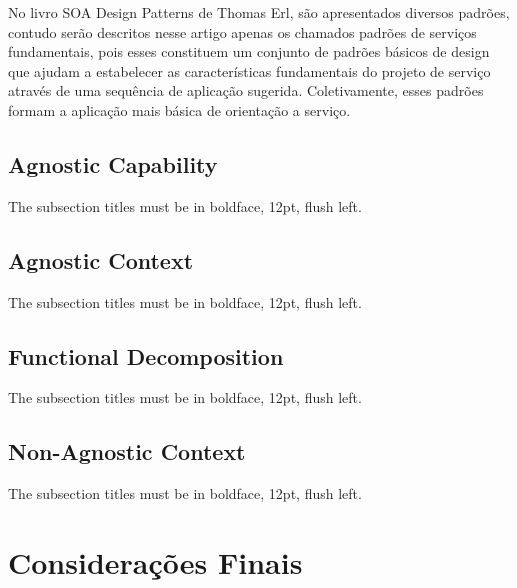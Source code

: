 \documentclass[12pt]{article}
\begin{document}
No livro SOA Design Patterns de Thomas Erl, são apresentados diversos padrões, contudo serão descritos nesse artigo apenas os chamados padrões de serviços fundamentais, pois esses constituem um conjunto de padrões básicos de design que ajudam a estabelecer as características fundamentais do projeto de serviço através de uma sequência de aplicação sugerida. Coletivamente, esses padrões formam a aplicação mais básica de orientação a serviço.


\subsection{Agnostic Capability}

The subsection titles must be in boldface, 12pt, flush left.

\subsection{Agnostic Context}

The subsection titles must be in boldface, 12pt, flush left.

\subsection{Functional Decomposition}

The subsection titles must be in boldface, 12pt, flush left.

\subsection{Non-Agnostic Context}

The subsection titles must be in boldface, 12pt, flush left.


\section{Considerações Finais}



\end{document}
